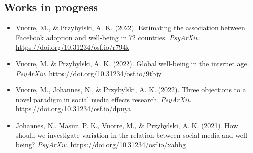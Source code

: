 \documentclass[12pt, a4paper]{article}
\begin{document}
\subsection*{Works in progress}
\begin{itemize}
\item Vuorre, M., \& Przybylski, A. K. (2022). Estimating the association between Facebook adoption and well-being in 72 countries. \emph{PsyArXiv}. \url{https://doi.org/10.31234/osf.io/r794k}
\item Vuorre, M. \& Przybylski, A. K. (2022). Global well-being in the internet age. \emph{PsyArXiv}. \url{https://doi.org/10.31234/osf.io/9tbjy}
\item Vuorre, M., Johannes, N., \& Przybylski, A. K. (2022). Three objections to a novel paradigm in social media effects research. \emph{PsyArXiv}. \url{https://doi.org/10.31234/osf.io/dpuya}
\item Johannes, N., Masur, P. K., Vuorre, M., \& Przybylski, A. K. (2021). How should we investigate variation in the relation between social media and well-being? \emph{PsyArXiv}. \url{https://doi.org/10.31234/osf.io/xahbg}
\end{itemize}
\end{document}
